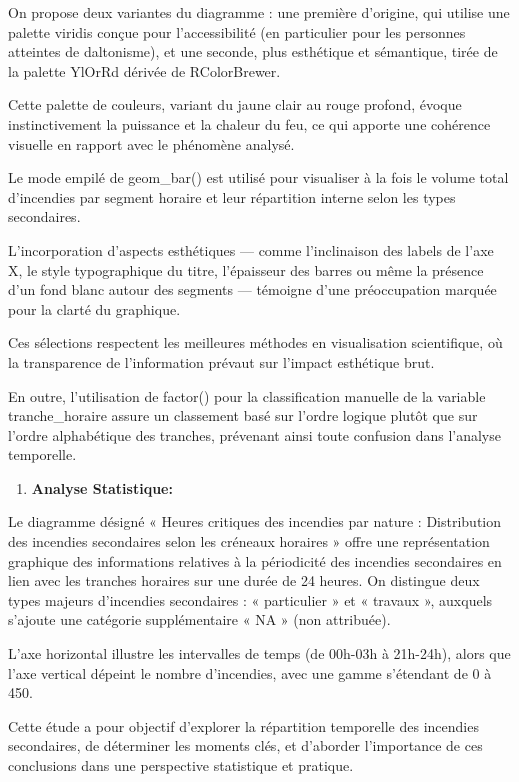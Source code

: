 \documentclass[
]{article}
\providecommand{\tightlist}{%
  \setlength{\itemsep}{0pt}\setlength{\parskip}{0pt}}
\begin{document}
On propose deux variantes du diagramme : une première d'origine, qui
utilise une palette viridis conçue pour l'accessibilité (en particulier
pour les personnes atteintes de daltonisme), et une seconde, plus
esthétique et sémantique, tirée de la palette YlOrRd dérivée de
RColorBrewer.

Cette palette de couleurs, variant du jaune clair au rouge profond,
évoque instinctivement la puissance et la chaleur du feu, ce qui apporte
une cohérence visuelle en rapport avec le phénomène analysé.

Le mode empilé de geom\_bar() est utilisé pour visualiser à la fois le
volume total d'incendies par segment horaire et leur répartition interne
selon les types secondaires.

L'incorporation d'aspects esthétiques --- comme l'inclinaison des labels
de l'axe X, le style typographique du titre, l'épaisseur des barres ou
même la présence d'un fond blanc autour des segments --- témoigne d'une
préoccupation marquée pour la clarté du graphique.

Ces sélections respectent les meilleures méthodes en visualisation
scientifique, où la transparence de l'information prévaut sur l'impact
esthétique brut.

En outre, l'utilisation de factor() pour la classification manuelle de
la variable tranche\_horaire assure un classement basé sur l'ordre
logique plutôt que sur l'ordre alphabétique des tranches, prévenant
ainsi toute confusion dans l'analyse temporelle.

\begin{enumerate}
\def\labelenumi{\arabic{enumi}.}
\setcounter{enumi}{1}
\tightlist
\item
  \textbf{Analyse Statistique:}
\end{enumerate}

Le diagramme désigné « Heures critiques des incendies par nature :
Distribution des incendies secondaires selon les créneaux horaires »
offre une représentation graphique des informations relatives à la
périodicité des incendies secondaires en lien avec les tranches horaires
sur une durée de 24 heures. On distingue deux types majeurs d'incendies
secondaires : « particulier » et « travaux », auxquels s'ajoute une
catégorie supplémentaire « NA » (non attribuée).

L'axe horizontal illustre les intervalles de temps (de 00h-03h à
21h-24h), alors que l'axe vertical dépeint le nombre d'incendies, avec
une gamme s'étendant de 0 à 450.

Cette étude a pour objectif d'explorer la répartition temporelle des
incendies secondaires, de déterminer les moments clés, et d'aborder
l'importance de ces conclusions dans une perspective statistique et
pratique.
\end{document}
